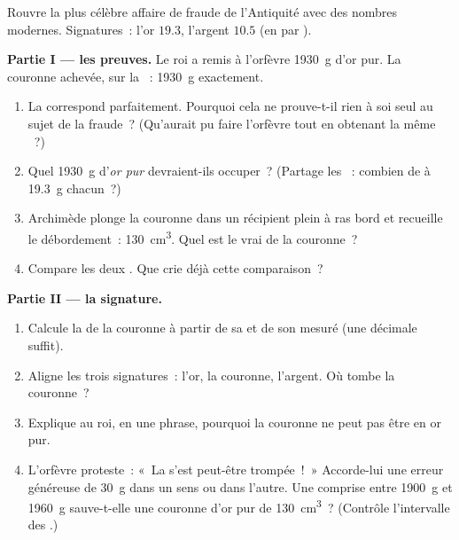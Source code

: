 \begin{problem}\label{pb:g6:density-floating:1}
Rouvre la plus célèbre affaire de fraude de l'Antiquité avec des
nombres modernes. Signatures~: l'or $19.3$, l'argent $10.5$ (en
 par ).

\medskip\noindent\textbf{Partie I --- les preuves.}
Le roi a remis à l'orfèvre \qty{1930}{g} d'or pur. La couronne
achevée, sur la ~: \qty{1930}{g} exactement.
\begin{enumerate}
  \item La  correspond parfaitement. Pourquoi cela ne prouve-t-il
        rien à soi seul au sujet de la fraude~? (Qu'aurait pu faire
        l'orfèvre tout en obtenant la même ~?)
  \item Quel  \qty{1930}{g} d'\emph{or pur} devraient-ils
        occuper~? (Partage les ~: combien de  à \qty{19.3}{g} chacun~?)
  \item Archimède plonge la couronne dans un récipient plein à ras
        bord et recueille le débordement~: \qty{130}{cm^3}. Quel est
        le vrai  de la couronne~?
  \item Compare les deux . Que crie déjà cette comparaison~?
\end{enumerate}

\medskip\noindent\textbf{Partie II --- la signature.}
\begin{enumerate}[resume]
  \item Calcule la  de la couronne à partir de sa
         et de son  mesuré (une décimale suffit).
  \item Aligne les trois signatures~: l'or, la couronne, l'argent.
        Où tombe la couronne~?
  \item Explique au roi, en une phrase, pourquoi la couronne ne peut
        pas être en or pur.
  \item L'orfèvre proteste~: «~La  s'est peut-être trompée~!~»
        Accorde-lui une erreur généreuse de \qty{30}{g} dans un sens
        ou dans l'autre. Une  comprise entre \qty{1900}{g} et
        \qty{1960}{g} sauve-t-elle une couronne d'or pur de 
        \qty{130}{cm^3}~? (Contrôle l'intervalle des .)
\end{enumerate}


\end{problem}
